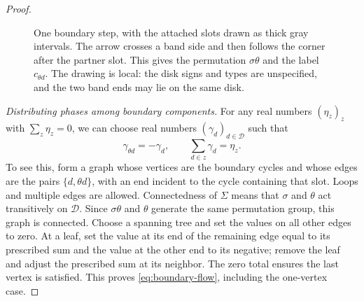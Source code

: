 \begin{proof}
\begin{figure}[tb]
\centering
{}
\caption{One boundary step, with the attached slots drawn as thick gray
intervals.  The arrow crosses a band side and then follows the corner
after the partner slot.  This gives the permutation $\sigma\theta$ and
the label $c_{\theta d}$.  The drawing is local: the disk signs and types
are unspecified, and the two band ends may lie on the same disk.}
\label{fig:boundary-step}
\end{figure}

\smallskip\noindent
\emph{Distributing phases among boundary components.}
For any real numbers $(\eta_z)_z$ with $\sum_z\eta_z=0$, we can choose
real numbers $(\gamma_d)_{d\in\mathcal D}$ such that
\begin{equation}\label{eq:boundary-flow}
 \gamma_{\theta d}=-\gamma_d,\qquad
 \sum_{d\in z}\gamma_d=\eta_z.
\end{equation}
To see this, form a graph whose vertices are the boundary cycles and
whose edges are the pairs $\{d,\theta d\}$, with an end incident to the
cycle containing that slot.  Loops and multiple edges are allowed.
Connectedness of $\Sigma$ means that $\sigma$ and $\theta$ act
transitively on $\mathcal D$.  Since $\sigma\theta$ and $\theta$ generate
the same permutation group, this graph is connected.  Choose a spanning
tree and set the values on all other edges to zero.  At a leaf, set the
value at its end of the remaining edge equal to its prescribed sum and
the value at the other end to its negative; remove the leaf and adjust
the prescribed sum at its neighbor.  The zero total ensures the last
vertex is satisfied.  This proves \eqref{eq:boundary-flow}, including
the one-vertex case.


\end{proof}
